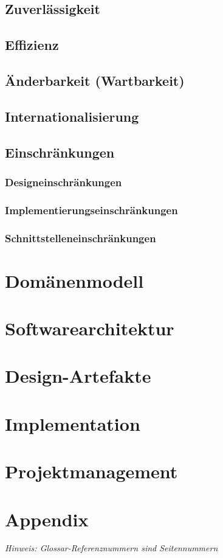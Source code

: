 \documentclass[11pt,ngerman]{article}
\begin{document}
    \subsection{Zuverlässigkeit}

    \subsection{Effizienz}

    \subsection{Änderbarkeit (Wartbarkeit)}

    \subsection{Internationalisierung}

    \subsection{Einschränkungen}

    \subsubsection{Designeinschränkungen}

    \subsubsection{Implementierungseinschränkungen}

    \subsubsection{Schnittstelleneinschränkungen}

    \section{Domänenmodell}

    \section{Softwarearchitektur}

    \section{Design-Artefakte}

    \section{Implementation}

    \section{Projektmanagement}


     \newpage

    \section{Appendix}
    \textit{Hinweis: Glossar-Referenznummern sind Seitennummern}
    \printglossary
\end{document}
